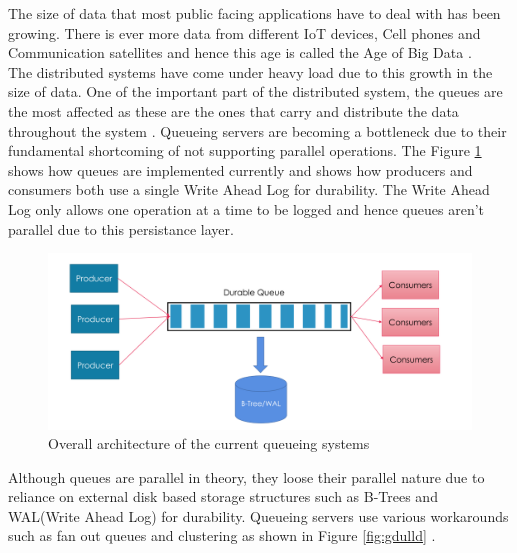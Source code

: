 \documentclass[12pt,a4paper]{article}
\begin{document}
 The size of data that most public facing applications have to deal with has been growing. There is ever more data from different IoT devices, Cell phones and Communication satellites and hence this age is called the Age of Big Data \citep{10333611920150101} \citep{lohr2012age}.\\
 
 
 The distributed systems have come under heavy load due to this growth in the size of data. One of the important part of the distributed system, the queues are the most affected as these are the ones that carry and distribute the data throughout the system \citep{lamport1978time}. Queueing servers are becoming a bottleneck due to their fundamental shortcoming of not supporting parallel operations. The Figure \ref{fig:gull} shows how queues are implemented currently and shows how producers and consumers both use a single Write Ahead Log for durability. The Write Ahead Log only allows one operation at a time to be logged and hence queues aren't parallel due to this persistance layer.\\ 
 
 \begin{figure}
 	\centering
 	\textbf{}\par\medskip
 	\includegraphics[scale=0.6]{1}
 	\caption{Overall architecture of the current queueing systems}
 	\label{fig:gull}
 \end{figure}
 
 

    
 Although queues are parallel in theory, they loose their parallel nature due to reliance on external disk based storage structures such as B-Trees and WAL(Write Ahead Log) for durability. Queueing servers use various workarounds such as fan out queues and clustering as shown in Figure \ref{fig:gdulld} \citep{albrecht2013making}.\\
 
\end{document}
